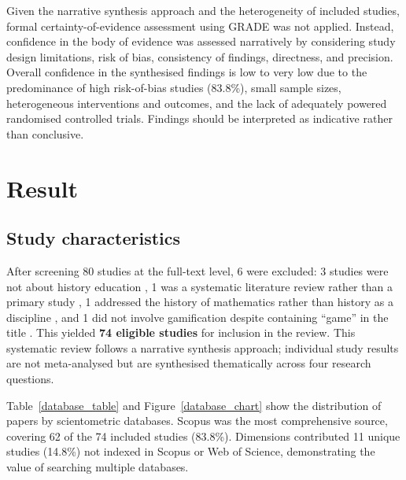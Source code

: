 \documentclass[a4paper,fleqn]{cas-sc}
\begin{document}
Given the narrative synthesis approach and the heterogeneity of included studies, formal certainty-of-evidence assessment using GRADE was not applied. Instead, confidence in the body of evidence was assessed narratively by considering study design limitations, risk of bias, consistency of findings, directness, and precision. Overall confidence in the synthesised findings is low to very low due to the predominance of high risk-of-bias studies (83.8\%), small sample sizes, heterogeneous interventions and outcomes, and the lack of adequately powered randomised controlled trials. Findings should be interpreted as indicative rather than conclusive.


\section{Result}
\label{sec:Results}




\subsection{Study characteristics}

After screening 80 studies at the full-text level, 6 were excluded: 3 studies were not about history education \citep{7Natvig2004F-1, 26Dias2021, 27Sumi2022}, 1 was a systematic literature review rather than a primary study \citep{33Oceja2022419}, 1 addressed the history of mathematics rather than history as a discipline \citep{57Huntley2011567}, and 1 did not involve gamification despite containing ``game'' in the title \citep{68cole2015end}. This yielded \textbf{74 eligible studies} for inclusion in the review. This systematic review follows a narrative synthesis approach; individual study results are not meta-analysed but are synthesised thematically across four research questions.

Table~\ref{database_table} and Figure~\ref{database_chart} show the distribution of papers by scientometric databases. Scopus was the most comprehensive source, covering 62 of the 74 included studies (83.8\%). Dimensions contributed 11 unique studies (14.8\%) not indexed in Scopus or Web of Science, demonstrating the value of searching multiple databases.
\end{document}
